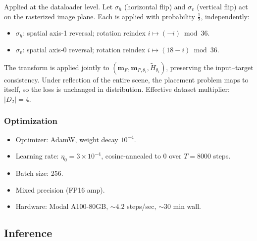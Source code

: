\documentclass[11pt]{article}
\begin{document}
Applied at the dataloader level.  Let $\sigma_h$ (horizontal flip) and $\sigma_v$ (vertical flip) act on the rasterized image plane.  Each is applied with probability $\tfrac12$, independently:
\begin{itemize}[leftmargin=*,nosep]
  \item $\sigma_h$: spatial axis-1 reversal; rotation reindex $i \mapsto (-i) \bmod 36$.
  \item $\sigma_v$: spatial axis-0 reversal; rotation reindex $i \mapsto (18 - i) \bmod 36$.
\end{itemize}

The transform is applied jointly to $(\mathbf{m}_F, \mathbf{m}_{P,\theta_i}, \tilde H_{\theta_i})$, preserving the input--target consistency.  Under reflection of the entire scene, the placement problem maps to itself, so the loss is unchanged in distribution.  Effective dataset multiplier: $\lvert D_2 \rvert = 4$.

\subsubsection{Optimization}

\begin{itemize}[leftmargin=*,nosep]
  \item Optimizer: AdamW, weight decay $10^{-4}$.
  \item Learning rate: $\eta_0 = 3 \times 10^{-4}$, cosine-annealed to 0 over $T = 8000$ steps.
  \item Batch size: 256.
  \item Mixed precision (FP16 amp).
  \item Hardware: Modal A100-80GB, $\sim 4.2$ steps/sec, $\sim 30$ min wall.
\end{itemize}

\subsection{Inference}\label{sec:inference}
\end{document}
